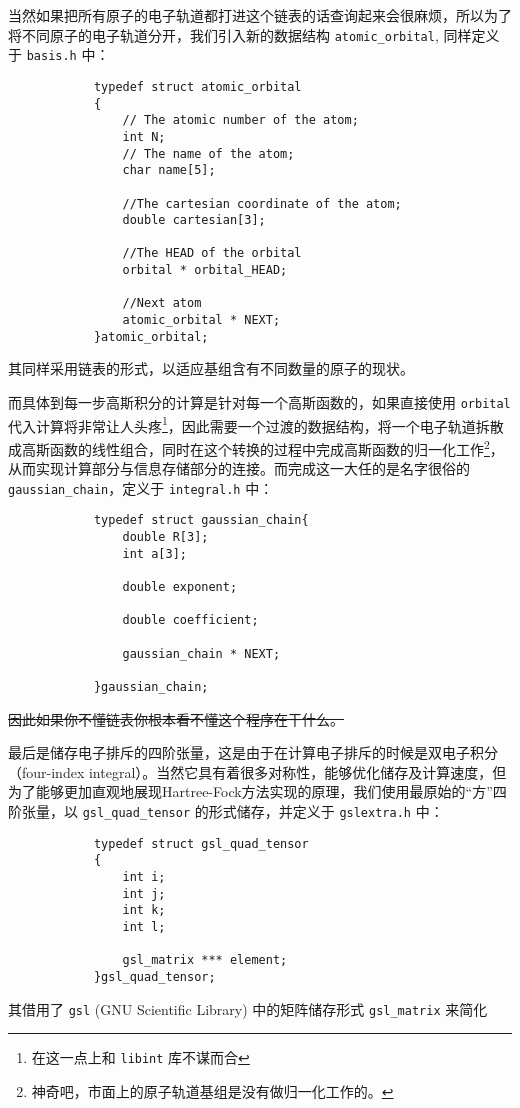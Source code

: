 \documentclass[12pt,a4paper,openany,twoside]{article}
\numberwithin{equation}{section}
\begin{document}
        当然如果把所有原子的电子轨道都打进这个链表的话查询起来会很麻烦，所以为了将不同原子的电子轨道分开，我们引入新的数据结构 \lstinline$atomic_orbital$, 同样定义于 \lstinline$basis.h$ 中：
        \begin{lstlisting}
            typedef struct atomic_orbital
            {
                // The atomic number of the atom;
                int N;
                // The name of the atom;
                char name[5];

                //The cartesian coordinate of the atom;
                double cartesian[3];

                //The HEAD of the orbital
                orbital * orbital_HEAD;

                //Next atom
                atomic_orbital * NEXT;
            }atomic_orbital;
        \end{lstlisting}
        其同样采用链表的形式，以适应基组含有不同数量的原子的现状。

        而具体到每一步高斯积分的计算是针对每一个高斯函数的，如果直接使用 \lstinline$orbital$ 代入计算将非常让人头疼\footnote{在这一点上和 \lstinline$libint$ 库不谋而合}，因此需要一个过渡的数据结构，将一个电子轨道拆散成高斯函数的线性组合，同时在这个转换的过程中完成高斯函数的归一化工作\footnote{神奇吧，市面上的原子轨道基组是没有做归一化工作的。}，从而实现计算部分与信息存储部分的连接。而完成这一大任的是名字很俗的 \lstinline$gaussian_chain$，定义于 \lstinline$integral.h$ 中：
        \begin{lstlisting}
            typedef struct gaussian_chain{
                double R[3];
                int a[3];
                
                double exponent;

                double coefficient;

                gaussian_chain * NEXT;

            }gaussian_chain;
        \end{lstlisting}
        \sout{因此如果你不懂链表你根本看不懂这个程序在干什么。}

        最后是储存电子排斥的四阶张量，这是由于在计算电子排斥的时候是双电子积分（four-index integral）。当然它具有着很多对称性，能够优化储存及计算速度，但为了能够更加直观地展现Hartree-Fock方法实现的原理，我们使用最原始的``方''四阶张量，以 \lstinline$gsl_quad_tensor$ 的形式储存，并定义于 \lstinline$gslextra.h$ 中：
        \begin{lstlisting}
            typedef struct gsl_quad_tensor
            {
                int i;
                int j;
                int k;
                int l;

                gsl_matrix *** element;
            }gsl_quad_tensor;
        \end{lstlisting}
        其借用了 \lstinline$gsl$ (GNU Scientific Library) 中的矩阵储存形式 \lstinline$gsl_matrix$ 来简化
    
\end{document}
